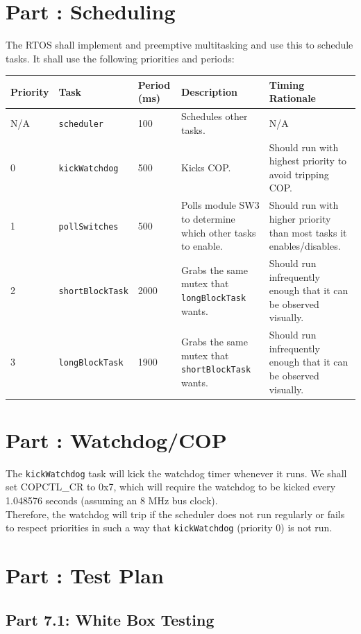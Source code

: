 \documentclass{article}
\newcounter{partNum}
\newcommand{\partNum}{%
        \stepcounter{partNum}%
        \thepartNum}
\newcommand{\sectPart}[1]{\section*{Part \partNum: #1}}
\begin{document}

\sectPart{Scheduling}

The RTOS shall implement and preemptive multitasking and use this to schedule tasks. It shall use the following priorities and periods:

\vspace{1em}
\begin{tabular}{|l|l|l|p{10em}|p{15em}|}
    \hline
    \textbf{Priority} & \textbf{Task} & \textbf{Period (ms)} & \textbf{Description} & \textbf{Timing Rationale} \\ \hline
    N/A & \texttt{scheduler} & 100 & Schedules other tasks. & N/A \\ \hline
    0 & \texttt{kickWatchdog} & 500 & Kicks COP. & Should run with highest priority to avoid tripping COP. \\ \hline
    1 & \texttt{pollSwitches} & 500 & Polls module SW3 to determine which other tasks to enable. & Should run with higher priority than most tasks it enables/disables. \\ \hline
    2 & \texttt{shortBlockTask} & 2000 & Grabs the same mutex that \texttt{longBlockTask} wants. & Should run infrequently enough that it can be observed visually. \\ \hline
    3 & \texttt{longBlockTask} & 1900 & Grabs the same mutex that \texttt{shortBlockTask} wants. & Should run infrequently enough that it can be observed visually. \\ \hline
\end{tabular}


\sectPart{Watchdog/COP}

The \texttt{kickWatchdog} task will kick the watchdog timer whenever it runs. We shall set COPCTL\_CR to 0x7, which will require the watchdog to be kicked every 1.048576 seconds (assuming an 8 MHz bus clock). \\
Therefore, the watchdog will trip if the scheduler does not run regularly or fails to respect priorities in such a way that \texttt{kickWatchdog} (priority 0) is not run.


\sectPart{Test Plan}

\subsection*{Part 7.1: White Box Testing}
\end{document}
